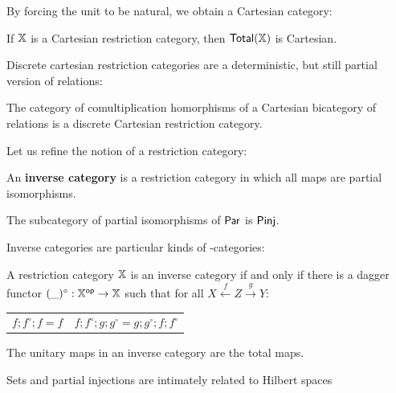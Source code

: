 By forcing the unit to be natural, we obtain a Cartesian category:

\begin{proposition} 
\label{prop:cartesian}
If $\mathbb{X}$ is a  Cartesian restriction category, then $\mathsf{Total}(\mathbb{X})$ is Cartesian.
\end{proposition}

Discrete cartesian restriction categories are a deterministic, but still partial version of relations:

\begin{lemma}
The category of comultiplication homorphisms of a Cartesian bicategory of relations is a discrete Cartesian restriction category.
\end{lemma}

Let us refine the notion of a restriction category:

\begin{definition}\cite[\S 2.3.2]{cockett}
An {\bf inverse category} is a restriction category in which all maps are partial isomorphisms.
\end{definition}

\begin{example}
The subcategory of partial isomorphisms of $\mathsf{Par}$ is  $\mathsf{Pinj}$.
\end{example}

Inverse categories are particular kinds of \dag-categories:

\begin{theorem}\cite[Thm. 2.20]{cockett}
A restriction category $\mathbb{X}$ is an inverse category if and only if there is a dagger functor $(\_)^\circ:\mathbb{X}^{\mathsf{op}}\to\mathbb{X}$ such that for all $X\xleftarrow{f} Z \xrightarrow{g} Y$:
\begin{center}
\begin{tabular}{cc}
 $f; f^\circ ; f = f$ & 
 $f ; f ^\circ ;g; g^\circ = g;g^\circ ; f; f ^\circ $
\end{tabular}
\end{center}
\end{theorem}

The unitary maps in an inverse category are the total maps.


Sets and partial injections are intimately related to Hilbert spaces

